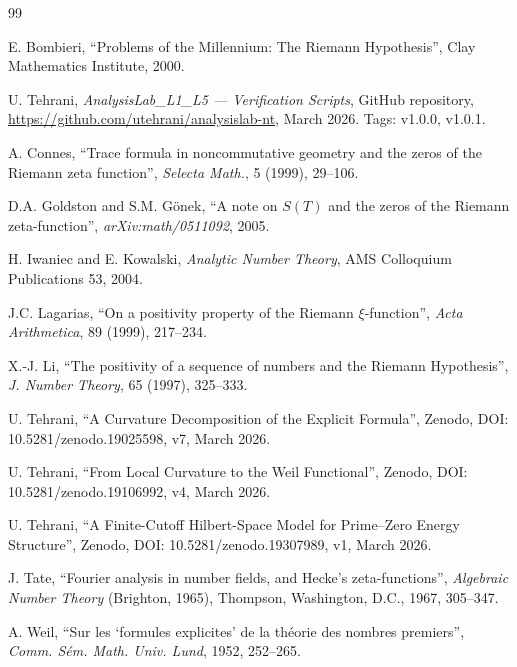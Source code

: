 \documentclass[11pt]{article}
\begin{document}
\begin{thebibliography}{99}

E. Bombieri, ``Problems of the Millennium: The Riemann Hypothesis'',
Clay Mathematics Institute, 2000.

U. Tehrani, \emph{AnalysisLab\_L1\_L5 --- Verification Scripts},
GitHub repository,
\url{https://github.com/utehrani/analysislab-nt},
March 2026. Tags: v1.0.0, v1.0.1.

A. Connes, ``Trace formula in noncommutative geometry and the zeros
of the Riemann zeta function'',
\emph{Selecta Math.}, 5 (1999), 29--106.

D.A. Goldston and S.M. G\"onek,
``A note on $S(T)$ and the zeros of the Riemann zeta-function'',
\emph{arXiv:math/0511092}, 2005.

H. Iwaniec and E. Kowalski,
\emph{Analytic Number Theory},
AMS Colloquium Publications 53, 2004.

J.C. Lagarias,
``On a positivity property of the Riemann $\xi$-function'',
\emph{Acta Arithmetica}, 89 (1999), 217--234.

X.-J. Li,
``The positivity of a sequence of numbers and the Riemann Hypothesis'',
\emph{J. Number Theory}, 65 (1997), 325--333.

U. Tehrani,
``A Curvature Decomposition of the Explicit Formula'',
Zenodo, DOI: 10.5281/zenodo.19025598, v7, March 2026.

U. Tehrani,
``From Local Curvature to the Weil Functional'',
Zenodo, DOI: 10.5281/zenodo.19106992, v4, March 2026.

U. Tehrani,
``A Finite-Cutoff Hilbert-Space Model for Prime--Zero Energy Structure'',
Zenodo, DOI: 10.5281/zenodo.19307989, v1, March 2026.

J. Tate,
``Fourier analysis in number fields, and Hecke's zeta-functions'',
\emph{Algebraic Number Theory} (Brighton, 1965),
Thompson, Washington, D.C., 1967, 305--347.

A. Weil,
``Sur les `formules explicites' de la th\'eorie des nombres premiers'',
\emph{Comm. S\'em. Math. Univ. Lund}, 1952, 252--265.

\end{thebibliography}

\appendix
\end{document}
